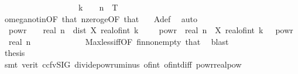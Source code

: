 \begin{isabellebody}
\ \ \ \ \ \ \ \ \ \ \ \ \ \ \ \ \ \ \ k\ {\isasymin}\ {\isacharbraceleft}{\kern0pt}{}{\isachardot}{\kern0pt}{\isachardot}{\kern0pt}{\isasymlfloor}{}\ {\isacharcircum}{\kern0pt}\ n\ {\isacharasterisk}{\kern0pt}\ T{\isasymrfloor}{\isacharbraceright}{\kern0pt}{\isacharbraceright}{\kern0pt}{\isachardoublequoteclose}\isanewline
\ \ \ \ \ \ \ \ \ \ \isamarkupfalse%
\ omega{\isacharunderscore}{\kern0pt}notin{\isacharbrackleft}{\kern0pt}OF\ that{\isacharparenleft}{\kern0pt}{}{\isacharparenright}{\kern0pt}{\isacharbrackright}{\kern0pt}\ nzero{\isacharunderscore}{\kern0pt}ge{\isacharbrackleft}{\kern0pt}OF\ that{\isacharparenleft}{\kern0pt}{}{\isacharparenright}{\kern0pt}{\isacharbrackright}{\kern0pt}\ {\isasymomega}\ \isamarkupfalse%
\ A{\isacharunderscore}{\kern0pt}def\ \isamarkupfalse%
\ auto\isanewline
\ \ \ \ \ \ \ \ \isamarkupfalse%
\ \isamarkupfalse%
\ {\isachardoublequoteopen}{}\ powr\ {\isacharparenleft}{\kern0pt}{\isacharminus}{\kern0pt}\ {\isasymgamma}\ {\isacharasterisk}{\kern0pt}\ real\ n{\isacharparenright}{\kern0pt}\ {\isachargreater}{\kern0pt}\ dist\ {\isacharparenleft}{\kern0pt}X\ {\isacharparenleft}{\kern0pt}real{\isacharunderscore}{\kern0pt}of{\isacharunderscore}{\kern0pt}int\ {\isacharparenleft}{\kern0pt}k\ {\isacharminus}{\kern0pt}\ {}{\isacharparenright}{\kern0pt}\ {\isacharasterisk}{\kern0pt}\ {}\ powr\ {\isacharminus}{\kern0pt}\ real\ n{\isacharparenright}{\kern0pt}\ {\isasymomega}{\isacharparenright}{\kern0pt}\ {\isacharparenleft}{\kern0pt}X\ {\isacharparenleft}{\kern0pt}real{\isacharunderscore}{\kern0pt}of{\isacharunderscore}{\kern0pt}int\ k\ {\isacharasterisk}{\kern0pt}\ {}\ powr\ {\isacharminus}{\kern0pt}\ real\ n{\isacharparenright}{\kern0pt}\ {\isasymomega}{\isacharparenright}{\kern0pt}{\isachardoublequoteclose}\isanewline
\ \ \ \ \ \ \ \ \ \ \isamarkupfalse%
\ Max{\isacharunderscore}{\kern0pt}less{\isacharunderscore}{\kern0pt}iff{\isacharbrackleft}{\kern0pt}OF\ fin{\isacharunderscore}{\kern0pt}nonempty{\isacharbrackright}{\kern0pt}\ that{\isacharparenleft}{\kern0pt}{}{\isacharparenright}{\kern0pt}\ \isamarkupfalse%
\ blast\isanewline
\ \ \ \ \ \ \ \ \isamarkupfalse%
\ \isamarkupfalse%
\ {\isacharquery}{\kern0pt}thesis\isanewline
\ \ \ \ \ \ \ \ \ \ \isamarkupfalse%
\ {\isacharparenleft}{\kern0pt}smt\ {\isacharparenleft}{\kern0pt}verit{\isacharcomma}{\kern0pt}\ ccfv{\isacharunderscore}{\kern0pt}SIG{\isacharparenright}{\kern0pt}\ divide{\isacharunderscore}{\kern0pt}powr{\isacharunderscore}{\kern0pt}uminus\ of{\isacharunderscore}{\kern0pt}int{\isacharunderscore}{\kern0pt}{}\ of{\isacharunderscore}{\kern0pt}int{\isacharunderscore}{\kern0pt}diff\ powr{\isacharunderscore}{\kern0pt}realpow{\isacharparenright}{\kern0pt}\isanewline

\end{isabellebody}
